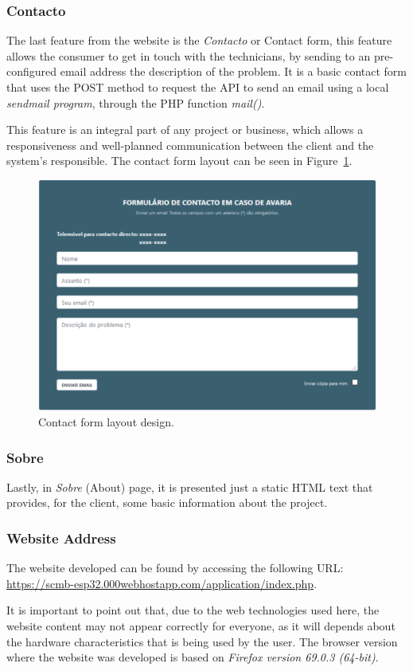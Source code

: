 \subsubsection{Contacto}

The last feature from the website is the \textit{Contacto} or Contact form, this feature allows the consumer to get in touch with the technicians, by sending to an pre-configured email address the description of the problem. It is a basic contact form that uses the POST method to request the \gls{API} to send an email using a local \textit{sendmail program}, through the \gls{PHP} function \textit{mail()}.

This feature is an integral part of any project or business, which allows a responsiveness and well-planned communication between the client and the system's responsible. The contact form layout can be seen in Figure~\ref{fig:contactForm}. 

\begin{figure}[h!]
    \centering
    \includegraphics[scale=0.5]{images/Development/web_database/contacto1.pdf}
    \caption{Contact form layout design.}
    \label{fig:contactForm}
\end{figure}


\subsubsection{Sobre}

Lastly, in \textit{Sobre} (About) page, it is presented just a static \gls{HTML} text that provides, for the client, some basic information about the project.

\subsubsection{Website Address}

The website developed can be found by accessing the following \gls{URL}: \url{https://scmb-esp32.000webhostapp.com/application/index.php}.

It is important to point out that, due to the web technologies used here, the website content may not appear correctly for everyone, as it will depends about the hardware characteristics that is being used by the user. The browser version where the website was developed is based on \textit{Firefox version 69.0.3 (64-bit)}.